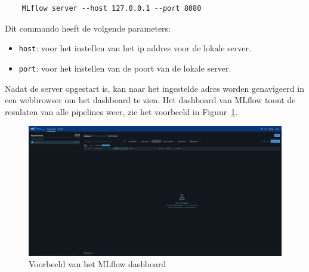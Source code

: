 \begin{verbatim}
    MLflow server --host 127.0.0.1 --port 8080
\end{verbatim}

Dit commando heeft de volgende parameters:

\begin{itemize}
    \item \texttt{host}: voor het instellen van het ip addres voor de lokale server.
    \item \texttt{port}: voor het instellen van de poort van de lokale server.
\end{itemize}

Nadat de server opgestart is, kan naar het ingestelde adres worden genavigeerd in een webbrowser om het dashboard te zien. Het dashboard van MLflow toont de resulaten van alle pipelines weer, zie het voorbeeld in Figuur~\ref{fig:MLflow_dashboard}.

\begin{figure}
    \centering
    \includegraphics[width=0.9\linewidth]{graphics/MLflow_dashboard.PNG}
    \caption{Voorbeeld van het MLflow dashboard}
    \label{fig:MLflow_dashboard}
\end{figure}